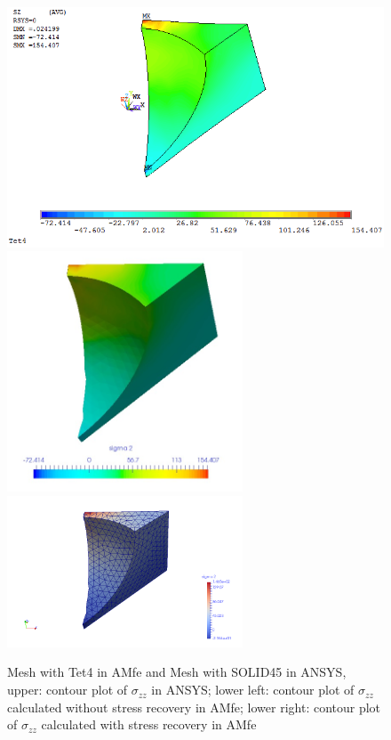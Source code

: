\begin{figure}[htbp]
	\begin{center}
		\includegraphics[width=13cm,clip]{Tet4Szz.png} 	
		\includegraphics[width=7cm,clip]{Tet4SzzPD.png} 	
		\includegraphics[width=7cm,clip]{Tet4SzzP.png} 		
		\caption{Mesh with Tet4 in AMfe and Mesh with SOLID45 in ANSYS, upper: contour plot of $\sigma_{zz}$ in ANSYS; lower left: contour plot of $\sigma_{zz}$ calculated without stress recovery in AMfe; lower right: contour plot of $\sigma_{zz}$ calculated with stress recovery in AMfe} \label{fig: Tet4_Szz}
	\end{center}
\end{figure}
\clearpage 

